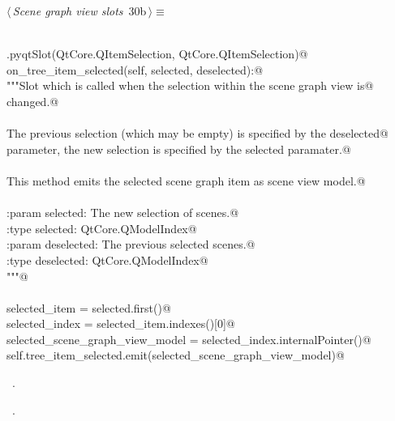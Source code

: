 \documentclass[
    a4paper,      %
    10pt,         %
    openright,    %
    notitlepage,  %
    parskip=half, %
]{scrreprt}       %
\theoremstyle{definition}                    %
\begin{document}
\begin{flushleft} \small
\begin{minipage}{\linewidth}\label{scrap30}\raggedright\small
{} $\langle\,${\itshape Scene graph view slots}\nobreak\ {\footnotesize {30b}}$\,\rangle\equiv$
\vspace{-1ex}
\begin{list}{}{} \item
\mbox{}\lstinline@@\\
\mbox{}\lstinline@QtCore.pyqtSlot(QtCore.QItemSelection, QtCore.QItemSelection)@\\
\mbox{}\lstinline@def on_tree_item_selected(self, selected, deselected):@\\
\mbox{}\lstinline@    """Slot which is called when the selection within the scene graph view is@\\
\mbox{}\lstinline@    changed.@\\
\mbox{}\lstinline@@\\
\mbox{}\lstinline@    The previous selection (which may be empty) is specified by the deselected@\\
\mbox{}\lstinline@    parameter, the new selection is specified by the selected paramater.@\\
\mbox{}\lstinline@@\\
\mbox{}\lstinline@    This method emits the selected scene graph item as scene view model.@\\
\mbox{}\lstinline@@\\
\mbox{}\lstinline@    :param selected: The new selection of scenes.@\\
\mbox{}\lstinline@    :type  selected: QtCore.QModelIndex@\\
\mbox{}\lstinline@    :param deselected: The previous selected scenes.@\\
\mbox{}\lstinline@    :type  deselected: QtCore.QModelIndex@\\
\mbox{}\lstinline@    """@\\
\mbox{}\lstinline@@\\
\mbox{}\lstinline@    selected_item = selected.first()@\\
\mbox{}\lstinline@    selected_index = selected_item.indexes()[0]@\\
\mbox{}\lstinline@    selected_scene_graph_view_model = selected_index.internalPointer()@\\
\mbox{}\lstinline@    self.tree_item_selected.emit(selected_scene_graph_view_model)@\\
\mbox{}\lstinline@@{\NWsep}
\end{list}
\vspace{-1.5ex}
\footnotesize
\begin{list}{}{\setlength{\itemsep}{-\parsep}\setlength{\itemindent}{-\leftmargin}}
\item \NWtxtMacroDefBy\ .
\item \NWtxtMacroRefIn\ .

\item{}
\end{list}
\end{minipage}\vspace{4ex}
\end{flushleft}
\end{document}
